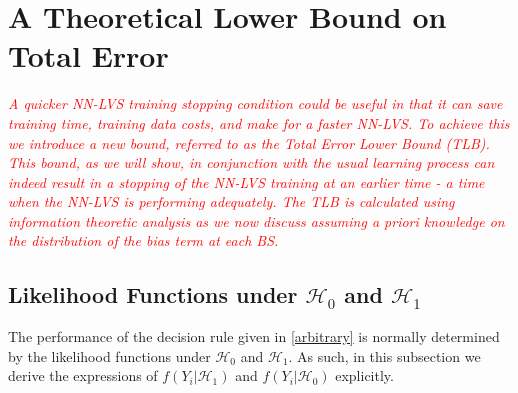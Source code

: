 \documentclass[journal]{IEEEtran}
\newcommand{\Hnull}{\mathcal{H}_0}
\newcommand{\Halt}{\mathcal{H}_1}
\begin{document}
\section{A Theoretical Lower Bound on Total Error}\label{section_5}
\textcolor{red}{\textit{A quicker NN-LVS training stopping condition could be useful in that it can  save  training time,  training data costs, and make for a faster NN-LVS. To achieve this we introduce a new bound, referred to as the Total Error Lower Bound (TLB). This bound, as we will show, in conjunction with the usual learning process can  indeed result in a stopping of the NN-LVS training at an earlier time -  a time when the NN-LVS is performing adequately. The TLB is calculated using information theoretic analysis as we now discuss  assuming a priori knowledge on the distribution of the bias term at each BS.}}

\subsection{Likelihood Functions under $\Hnull$ and $\Halt$}
The performance of the decision rule given in \eqref{arbitrary} is normally determined by the likelihood functions under $\Hnull$ and $\Halt$. As such, in this subsection we derive the expressions of $f\left(Y_i|\Halt\right)$ and $f\left(Y_i|\Hnull\right)$ explicitly.
\end{document}
